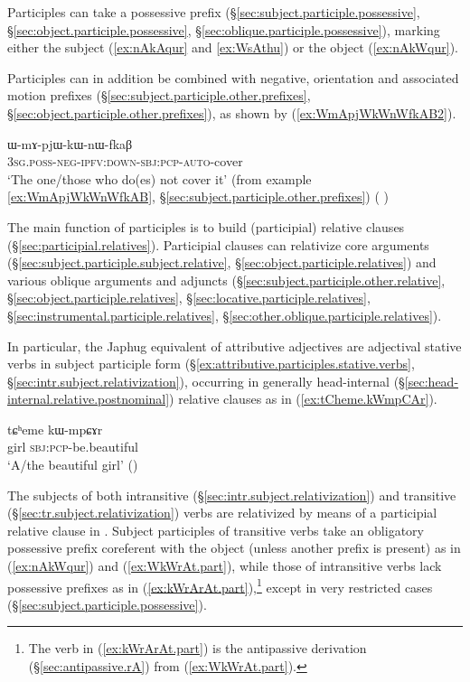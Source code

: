 Participles can take a possessive prefix (§\ref{sec:subject.participle.possessive}, §\ref{sec:object.participle.possessive}, §\ref{sec:oblique.participle.possessive}), marking either the subject (\ref{ex:nAkAqur} and \ref{ex:WsAthu}) or the object (\ref{ex:nAkWqur}).  

Participles can in addition be combined with negative, orientation and associated motion prefixes (§\ref{sec:subject.participle.other.prefixes}, §\ref{sec:object.participle.other.prefixes}), as shown by (\ref{ex:WmApjWkWnWfkAB2}).

\begin{exe}
\ex \label{ex:WmApjWkWnWfkAB2}
\gll ɯ-mɤ-pjɯ-kɯ-nɯ-fkaβ \\
\textsc{3sg}.\textsc{poss}-\textsc{neg}-\textsc{ipfv}:\textsc{down}-\textsc{sbj}:\textsc{pcp}-\textsc{auto}-cover \\
\glt `The one/those who do(es) not cover it' (from example \ref{ex:WmApjWkWnWfkAB}, §\ref{sec:subject.participle.other.prefixes}) (
)
\end{exe}

The main function of participles is to build (participial) relative clauses (§\ref{sec:participial.relatives}). Participial clauses can relativize core arguments (§\ref{sec:subject.participle.subject.relative}, §\ref{sec:object.participle.relatives}) and various oblique arguments and adjuncts (§\ref{sec:subject.participle.other.relative}, §\ref{sec:object.participle.relatives}, §\ref{sec:locative.participle.relatives}, §\ref{sec:instrumental.participle.relatives}, §\ref{sec:other.oblique.participle.relatives}).

In particular, the Japhug equivalent of attributive adjectives are adjectival stative verbs in subject participle form (§\ref{ex:attributive.participles.stative.verbs}, §\ref{sec:intr.subject.relativization}), occurring in generally head-internal (§\ref{sec:head-internal.relative.postnominal}) relative clauses as in (\ref{ex:tCheme.kWmpCAr}).

\begin{exe}
\ex \label{ex:tCheme.kWmpCAr}
\gll tɕʰeme kɯ-mpɕɤr \\
girl \textsc{sbj}:\textsc{pcp}-be.beautiful \\
\glt `A/the beautiful girl' 
()
\end{exe}

The subjects of both intransitive (§\ref{sec:intr.subject.relativization}) and transitive (§\ref{sec:tr.subject.relativization}) verbs are relativized by means of a participial relative clause in . Subject participles of transitive verbs take an obligatory possessive prefix coreferent with the object (unless another prefix is present) as in (\ref{ex:nAkWqur}) and (\ref{ex:WkWrAt.part}), while those of intransitive verbs lack possessive prefixes as in (\ref{ex:kWrArAt.part}),\footnote{The verb  in (\ref{ex:kWrArAt.part}) is the antipassive derivation (§\ref{sec:antipassive.rA}) from  (\ref{ex:WkWrAt.part}). } except in very restricted cases (§\ref{sec:subject.participle.possessive}).

